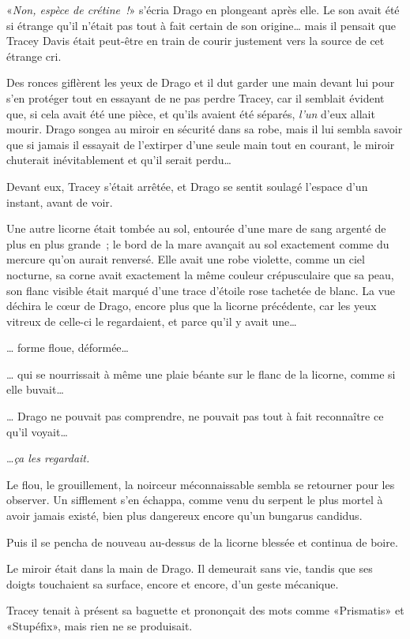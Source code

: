 «\emph{Non, espèce de crétine~!}» s'écria Drago en plongeant après elle. Le son avait été si étrange qu'il n'était pas tout à fait certain de son origine… mais il pensait que Tracey Davis était peut-être en train de courir justement vers la source de cet étrange cri.

Des ronces giflèrent les yeux de Drago et il dut garder une main devant lui pour s'en protéger tout en essayant de ne pas perdre Tracey, car il semblait évident que, si cela avait été une pièce, et qu'ils avaient été séparés, \emph{l'un} d'eux allait mourir. Drago songea au miroir en sécurité dans sa robe, mais il lui sembla savoir que si jamais il essayait de l'extirper d'une seule main tout en courant, le miroir chuterait inévitablement et qu'il serait perdu…

Devant eux, Tracey s'était arrêtée, et Drago se sentit soulagé l'espace d'un instant, avant de voir.

Une autre licorne était tombée au sol, entourée d'une mare de sang argenté de plus en plus grande~; le bord de la mare avançait au sol exactement comme du mercure qu'on aurait renversé. Elle avait une robe violette, comme un ciel nocturne, sa corne avait exactement la même couleur crépusculaire que sa peau, son flanc visible était marqué d'une trace d'étoile rose tachetée de blanc. La vue déchira le cœur de Drago, encore plus que la licorne précédente, car les yeux vitreux de celle-ci le regardaient, et parce qu'il y avait une…

… forme floue, déformée…

… qui se nourrissait à même une plaie béante sur le flanc de la licorne, comme si elle buvait…

… Drago ne pouvait pas comprendre, ne pouvait pas tout à fait reconnaître ce qu'il voyait…

…\emph{ça les regardait.}

Le flou, le grouillement, la noirceur méconnaissable sembla se retourner pour les observer. Un sifflement s'en échappa, comme venu du serpent le plus mortel à avoir jamais existé, bien plus dangereux encore qu'un bungarus candidus.

Puis il se pencha de nouveau au-dessus de la licorne blessée et continua de boire.

Le miroir était dans la main de Drago. Il demeurait sans vie, tandis que ses doigts touchaient sa surface, encore et encore, d'un geste mécanique.

Tracey tenait à présent sa baguette et prononçait des mots comme «Prismatis» et «Stupéfix», mais rien ne se produisait.

